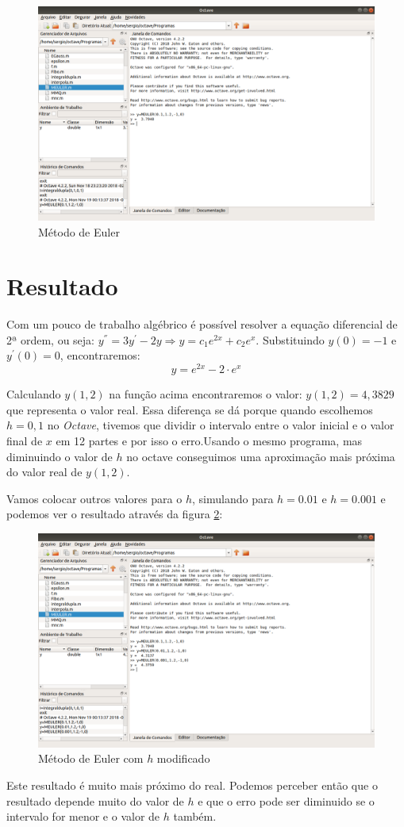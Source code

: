\documentclass[11pt, openright, a4paper, brazil, openany, oneside]{abntex2}
\begin{document}
\begin{figure}[ht]

    \center

    \includegraphics[width=12cm]{octave3.png}
    \caption{Método de Euler \label{octave3}}
    
\end{figure}

\section{Resultado}

Com um pouco de trabalho algébrico é possível resolver a equação diferencial de 2ª ordem, ou seja: $y^{''} = 3y^{'} - 2y \Rightarrow y=c_1e^{2x} + c_2e^{x}$. Substituindo $y(0) = -1$ e $y^{'}(0) = 0$, encontraremos: 
$$y=e^{2x} - 2\cdot e^{x}$$

Calculando $y(1,2)$ na função acima encontraremos o valor: $y(1,2) = 4,3829$ que representa o valor real. Essa diferença se dá porque quando escolhemos $h = 0,1$ no \textit{Octave}, tivemos que dividir o intervalo entre o valor inicial e o valor final de $x$ em 12 partes e por isso o erro.Usando o mesmo programa, mas diminuindo o valor de $h$ no octave conseguimos uma aproximação mais próxima do valor real de $y(1,2)$.

Vamos colocar outros valores para o $h$, simulando para $h = 0.01$ e $h = 0.001$ e podemos ver o resultado através da figura \ref{octave4}:

\begin{figure}[ht]

    \center

    \includegraphics[width=12cm]{octave4.png}
    \caption{Método de Euler com $h$ modificado\label{octave4}}
    
\end{figure}

Este resultado é muito mais próximo do real. Podemos perceber então que o resultado depende muito do valor de $h$ e que o erro pode ser diminuido se o intervalo for menor e o valor de $h$ também.
\end{document}
